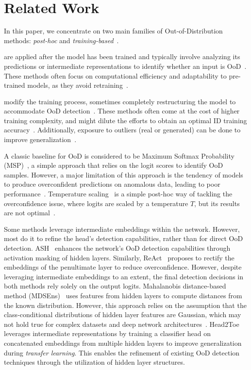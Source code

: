 \section{Related Work}
\label{sec:related}
In this paper, we concentrate on two main families of Out-of-Distribution methods: \textit{post-hoc} and \textit{training-based}~\cite{liu2021towards, yang2024generalized}.

 are applied after the model has been trained and typically involve analyzing its predictions or intermediate representations to identify whether an input is OoD~\cite{guo2017calibration, wei2022mitigating, hendrycks2018baseline}. These methods often focus on computational efficiency and adaptability to pre-trained models, as they avoid retraining~\cite{liu2021towards}.

 modify the training process, sometimes completely restructuring the model to accommodate OoD detection~\cite{chang2020generalized, devries2018learning, tack2020csi}. These methods often come at the cost of higher training complexity, and might dilute the efforts to obtain an optimal ID training accuracy~\cite{liu2021towards, masana2018metric}. Additionally, exposure to outliers (real or generated) can be done to improve generalization~\cite{wang2023learning}.

A classic baseline for OoD is considered to be Maximum Softmax Probability (MSP)~\cite{hendrycks2018baseline}, a simple approach that relies on the logit scores to identify OoD samples. However, a major limitation of this approach is the tendency of models to produce overconfident predictions on anomalous data, leading to poor performance~\cite{guo2017calibration}. Temperature scaling~\cite{guo2017calibration} is a simple post-hoc way of tackling the overconfidence issue, where logits are scaled by a temperature $T$, but its results are not optimal~\cite{zhang2024openood}.

Some methods leverage intermediate embeddings within the network. However, most do it to refine the head's detection capabilities, rather than for direct OoD detection. ASH~\cite{djurisic2023extremely} enhances the network's OoD detection capabilities through activation masking of hidden layers. Similarly, ReAct~\cite{sun2021react} proposes to rectify the embeddings of the penultimate layer to reduce overconfidence. However, despite leveraging intermediate embeddings to an extent, the final detection decisions in both methods rely solely on the output logits. Mahalanobis distance-based method (MDSEns)~\cite{lee2018simple} uses features from hidden layers to compute distances from the known distribution. However, this approach relies on the assumption that the class-conditional distributions of hidden layer features are Gaussian, which may not hold true for complex datasets and deep network architectures~\cite{venkataramanan2023gaussian}. Head2Toe~\cite{evci2022head2toe} leverages intermediate representations by training a classifier head on concatenated embeddings from multiple hidden layers to improve generalization during \textit{transfer learning}. This enables the refinement of existing OoD detection techniques through the utilization of hidden layer structures.
